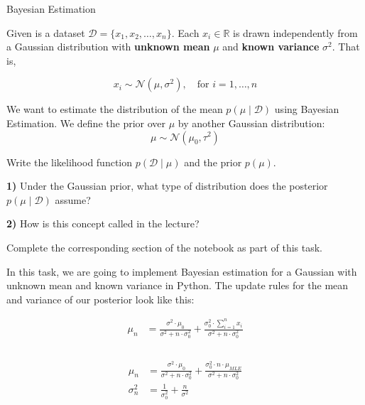 \documentclass[
	english,
        solution=true
	]{tudaexercise}
\begin{document}
\begin{task}[points=16]{Bayesian Estimation}

Given is a dataset \( \mathcal{D} = \{x_1, x_2, \dots, x_n\} \). Each \( x_i \in \mathbb{R} \) is drawn independently from a Gaussian distribution with \textbf{unknown mean} \( \mu \) and \textbf{known variance} \( \sigma^2 \). That is,

\[
x_i \sim \mathcal{N}(\mu, \sigma^2), \quad \text{for } i = 1, \dots, n
\]

We want to estimate the distribution of the mean $ p(\mu \mid \mathcal{D}) $ using Bayesian Estimation. We define the prior over $\mu$ by another Gaussian distribution:
\[
\mu \sim \mathcal{N}(\mu_0, \tau^2)
\]
\begin{subtask}[points=2]{}
    Write the likelihood function $p(\mathcal{D} \mid \mu)$ and the prior $p(\mu)$.
\end{subtask}

\begin{solution}

\end{solution}

\begin{subtask}[points=2]


\textbf{1)} Under the Gaussian prior, what type of distribution does the posterior $ p(\mu \mid \mathcal{D})$ assume? 

\textbf{2)} How is this concept called in the lecture?
\end{subtask}

\begin{solution}

\end{solution}

\begin{subtask}[points=12]

\begin{programmingtaskbox}
Complete the corresponding section of the notebook as part of this task.
\end{programmingtaskbox}
    In this task, we are going to implement Bayesian estimation for a Gaussian with unknown mean and known variance in Python. The update rules for the mean and variance of our posterior look like this:

    \begin{align}
        \mu_{n} &= \frac{\sigma^{2} \cdot \mu_{0}}{\sigma^{2}+n\cdot\sigma_{0}^{2}} + \frac{\sigma_{0}^{2}\cdot \sum_{i=1}^{n} x_i}{\sigma^{2}+n\cdot\sigma_{0}^{2}}\\
    \end{align}
        \\
    \begin{align}
        \mu_{n} &= \frac{\sigma^{2} \cdot \mu_{0}}{\sigma^{2}+n\cdot\sigma_{0}^{2}} + \frac{\sigma_{0}^{2}\cdot n \cdot \mu_{MLE}}{\sigma^{2}+n\cdot\sigma_{0}^{2}}\\
        \sigma_{n}^{2} &= \frac{1}{\sigma_{0}^{2}} + \frac{n}{\sigma^{2}} 
    \end{align}


\end{subtask}
\end{task}
\end{document}
